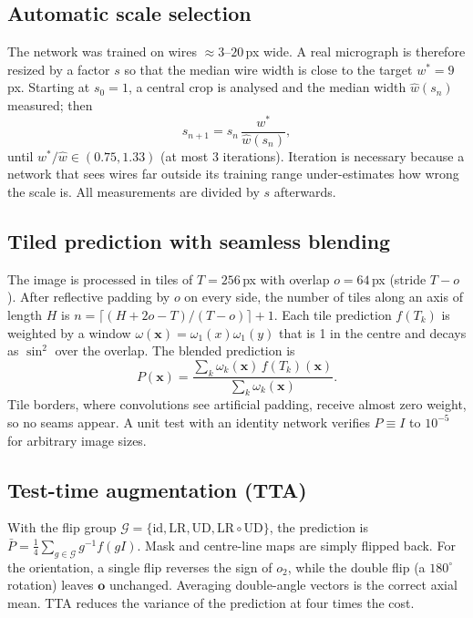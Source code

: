 \documentclass[11pt,a4paper]{article}
\begin{document}
\subsection{Automatic scale selection}\label{sec:autoscale}
The network was trained on wires $\approx3$--$20$\,px wide. A real micrograph is therefore resized by a factor $s$ so that the median wire width is close to the target $w^\ast=9$\,px. Starting at $s_0=1$, a central crop is analysed and the median width $\hat w(s_n)$ measured; then
\begin{equation}
s_{n+1}=s_n\,\frac{w^\ast}{\hat w(s_n)},
\end{equation}
until $w^\ast/\hat w\in(0.75,1.33)$ (at most 3 iterations). Iteration is necessary because a network that sees wires far outside its training range under-estimates how wrong the scale is. All measurements are divided by $s$ afterwards.

\subsection{Tiled prediction with seamless blending}
The image is processed in tiles of $T=256$\,px with overlap $o=64$\,px (stride $T-o$). After reflective padding by $o$ on every side, the number of tiles along an axis of length $H$ is $n=\lceil(H+2o-T)/(T-o)\rceil+1$. Each tile prediction $f(T_k)$ is weighted by a window $\omega(\mathbf x)=\omega_1(x)\omega_1(y)$ that is 1 in the centre and decays as $\sin^2$ over the overlap. The blended prediction is
\begin{equation}
P(\mathbf x)=\frac{\sum_k\omega_k(\mathbf x)\,f(T_k)(\mathbf x)}{\sum_k\omega_k(\mathbf x)} .
\end{equation}
Tile borders, where convolutions see artificial padding, receive almost zero weight, so no seams appear. A unit test with an identity network verifies $P\equiv I$ to $10^{-5}$ for arbitrary image sizes.

\subsection{Test-time augmentation (TTA)}
With the flip group $\mathcal G=\{\mathrm{id},\text{LR},\text{UD},\text{LR}\circ\text{UD}\}$, the prediction is
$\bar P=\frac14\sum_{g\in\mathcal G}g^{-1}f(gI)$. Mask and centre-line maps are simply flipped back. For the orientation, a single flip reverses the sign of $o_2$, while the double flip (a $180^\circ$ rotation) leaves $\mathbf o$ unchanged. Averaging double-angle vectors is the correct axial mean. TTA reduces the variance of the prediction at four times the cost.
\end{document}
